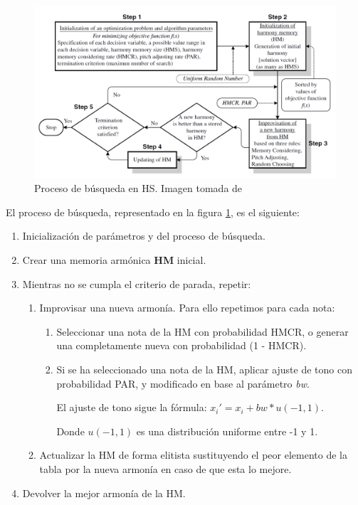 \begin{figure}[H]
    \centering
    \includegraphics[width=0.95\linewidth]{img/b.png}
    \caption{Proceso de búsqueda en HS. Imagen tomada de \cite{hs1}}
    \label{proceso}
\end{figure}

\vspace{\baselineskip}

El proceso de búsqueda, representado en la figura \ref{proceso}, es el siguiente:
\begin{enumerate}
    \item Inicialización de parámetros y del proceso de búsqueda.
    \item Crear una memoria armónica \textbf{HM} inicial.
    \item Mientras no se cumpla el criterio de parada, repetir:
    \begin{enumerate}
        \item Improvisar una nueva armonía. Para ello repetimos para cada nota:
        \begin{enumerate}
            \item Seleccionar una nota de la HM con probabilidad HMCR, o generar una completamente nueva con probabilidad (1 - HMCR).
            \item Si se ha seleccionado una nota de la HM, aplicar ajuste de tono con probabilidad PAR, y modificado en base al parámetro \textit{bw}.
            
            El ajuste de tono sigue la fórmula: $x_i' = x_i + bw * u(-1, 1)$.

            Donde $u(-1,1)$ es una distribución uniforme entre -1 y 1.
        \end{enumerate}
        \item Actualizar la HM de forma elitista sustituyendo el peor elemento de la tabla por la nueva armonía en caso de que esta lo mejore.
    \end{enumerate}
    \item Devolver la mejor armonía de la HM.
\end{enumerate}

